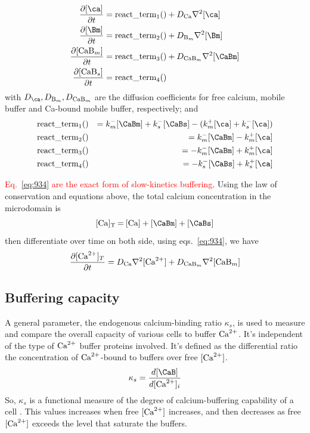\begin{equation}
  \label{eq:934}
\begin{split}
  \frac{\partial [\ca]}{\partial t} &= \text{react\_term}_1() + D_{\ce{Ca}}\nabla^2[\ca]\\
  \frac{\partial [\Bm]}{\partial t} &= \text{react\_term}_2() +
  D_{\ce{B_m}}\nabla^2[\Bm]\\
  \frac{\partial [\ce{CaB_m}]}{\partial t} &= \text{react\_term}_3() + D_{\ce{CaB_m}}\nabla^2[\CaBm] \\
  \frac{\partial [\ce{CaB_s}]}{\partial t} &= \text{react\_term}_4()
\end{split} 
\end{equation}
with $D_\ca,D_{\ce{B_m}}, D_{\ce{CaB_m}}$ are the diffusion coefficients for
free calcium, mobile buffer and Ca-bound mobile buffer, respectively; and
\begin{eqnarray*}
  \text{react\_term}_1() &&= k^-_m[\CaBm]+k^-_s[\CaBs] - ( k^+_m[\ca]
  + k^-_s[\ca]) \\
  \text{react\_term}_2() &&= k^-_m[\CaBm] -  k^+_m[\ca] \\
  \text{react\_term}_3() &&= -k^-_m[\CaBm] +  k^+_m[\ca] \\
  \text{react\_term}_4() &&= -k^-_s[\CaBs] +  k^+_s[\ca] 
\end{eqnarray*}

\textcolor{red}{Eq.~\eqref{eq:934} are the exact form of slow-kinetics
  buffering}. Using the law of conservation and equations above, the total
  calcium concentration in the microdomain is
\begin{equation}
  \label{eq:935}
  \ce{[Ca]_T = [Ca] + [\CaBm] + [\CaBs]}
\end{equation}
then differentiate over time on both side, using eqs.~\eqref{eq:934},
we have
\begin{equation}
  \label{eq:936}
  \frac{\partial[\Ca]_T}{\partial t} = D_{\ce{Ca}}\nabla^2[\Ca] +
  D_{\ce{CaB_m}}\nabla^2[\ce{CaB_m}]
\end{equation}

\subsection{Buffering capacity}
\label{sec:buffer_capacity}

A general parameter, the endogenous calcium-binding ratio $\kappa_s$, is used
to measure and compare the overall capacity of various cells to buffer ${\text{Ca}^{2+}}$. It's independent
of the type of ${\text{Ca}^{2+}}$ buffer proteins involved.
It's defined as the differential ratio the concentration of
${\text{Ca}^{2+}}$-bound to buffers over free $[{\text{Ca}^{2+}}]$.
\begin{equation}
\kappa_s = \frac{d[\CaB]}{d[\Ca]_i}
\end{equation}
So, $\kappa_s$ is a functional measure of the degree of calcium-buffering
capability of a cell \citep{Neher1998}. This values increases when free $[{\text{Ca}^{2+}}]$
increases, and then decreases as free $[{\text{Ca}^{2+}}]$ exceeds the level that saturate the buffers.

